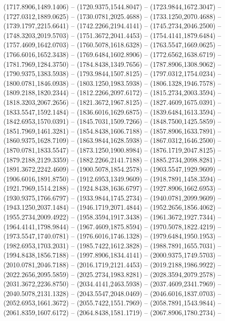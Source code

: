 \begin{scope}[y=0.80pt, x=0.80pt, yscale=-1.000000, xscale=1.000000, inner sep=0pt, outer sep=0pt]
    (1717.8906,1489.1406) -- (1720.9375,1544.8047) -- (1723.9844,1672.3047) --
    (1727.0312,1889.0625) -- (1730.0781,2025.4688) -- (1733.1250,2070.4688) --
    (1739.1797,2215.6641) -- (1742.2266,2194.4141) -- (1745.2734,2046.2500) --
    (1748.3203,2019.5703) -- (1751.3672,2041.4453) -- (1754.4141,1879.6484) --
    (1757.4609,1642.0703) -- (1760.5078,1618.6328) -- (1763.5547,1669.0625) --
    (1766.6016,1652.3438) -- (1769.6484,1602.8906) -- (1772.6562,1638.6719) --
    (1781.7969,1284.3750) -- (1784.8438,1349.7656) -- (1787.8906,1308.9062) --
    (1790.9375,1383.5938) -- (1793.9844,1507.8125) -- (1797.0312,1754.0234) --
    (1800.0781,1846.0938) -- (1803.1250,1983.5938) -- (1806.1328,1946.7578) --
    (1809.2188,1820.2344) -- (1812.2266,2097.6172) -- (1815.2734,2003.3594) --
    (1818.3203,2067.2656) -- (1821.3672,1967.8125) -- (1827.4609,1675.0391) --
    (1833.5547,1592.1484) -- (1836.6016,1629.6875) -- (1839.6484,1613.3594) --
    (1842.6953,1570.0391) -- (1845.7031,1509.7266) -- (1848.7500,1425.5859) --
    (1851.7969,1461.3281) -- (1854.8438,1606.7188) -- (1857.8906,1633.7891) --
    (1860.9375,1628.7109) -- (1863.9844,1628.5938) -- (1867.0312,1646.2500) --
    (1870.0781,1833.5547) -- (1873.1250,1900.8984) -- (1876.1719,2047.8125) --
    (1879.2188,2129.3359) -- (1882.2266,2141.7188) -- (1885.2734,2098.8281) --
    (1891.3672,2242.4609) -- (1900.5078,1854.2578) -- (1903.5547,1929.9609) --
    (1906.6016,1891.8750) -- (1912.6953,1349.9609) -- (1918.7891,1458.3594) --
    (1921.7969,1514.2188) -- (1924.8438,1636.6797) -- (1927.8906,1662.6953) --
    (1930.9375,1766.6797) -- (1933.9844,1745.2734) -- (1940.0781,2099.9609) --
    (1943.1250,2037.1484) -- (1946.1719,2071.4844) -- (1952.2656,1856.4062) --
    (1955.2734,2009.4922) -- (1958.3594,1917.3438) -- (1961.3672,1927.7344) --
    (1964.4141,1798.9844) -- (1967.4609,1875.8594) -- (1970.5078,1822.4219) --
    (1973.5547,1740.0781) -- (1976.6016,1746.1328) -- (1979.6484,1950.1953) --
    (1982.6953,1703.2031) -- (1985.7422,1612.3828) -- (1988.7891,1655.7031) --
    (1994.8438,1856.7188) -- (1997.8906,1834.4141) -- (2000.9375,1749.5703) --
    (2010.0781,2046.7188) -- (2016.1719,2121.4453) -- (2019.2188,1986.9922) --
    (2022.2656,2095.5859) -- (2025.2734,1983.8281) -- (2028.3594,2079.2578) --
    (2031.3672,2236.8750) -- (2034.4141,2463.5938) -- (2037.4609,2341.7969) --
    (2040.5078,2131.1328) -- (2043.5547,2048.0469) -- (2046.6016,1837.0703) --
    (2052.6953,1661.3672) -- (2055.7422,1551.7969) -- (2058.7891,1543.9844) --
    (2061.8359,1607.6172) -- (2064.8438,1581.1719) -- (2067.8906,1780.2734) --

\end{scope}
